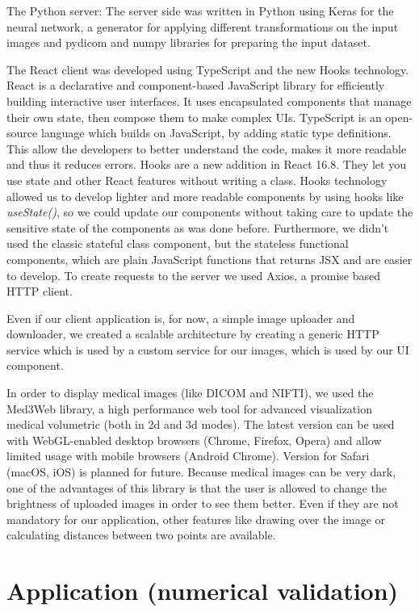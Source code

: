 \documentclass[runningheads,a4paper,11pt]{report}
\begin{document}
The Python server: The server side was written in Python using Keras for the neural network, a generator for applying different transformations on the input images and pydicom and numpy libraries for preparing the input dataset.\par
The React client was developed using TypeScript and the new Hooks technology.
React is a declarative and component-based JavaScript library for efficiently building interactive user interfaces. It uses encapsulated components that manage their own state, then compose them to make complex UIs.\cite{react}
TypeScript is an open-source language which builds on JavaScript, by adding static type definitions. This allow the developers to better understand the code, makes it more readable and thus it reduces errors.
Hooks are a new addition in React 16.8. They let you use state and other React features without writing a class\cite{reactHooks}. Hooks technology allowed us to develop lighter and more readable components by using hooks like \emph{useState()}, so we could update our components without taking care to update the sensitive state of the components as was done before. Furthermore, we didn't used the classic stateful class component, but the stateless functional components, which are plain JavaScript functions that returns JSX and are easier to develop.
To create requests to the server we used Axios, a promise based HTTP client.

Even if our client application is, for now, a simple image uploader and downloader, we created a scalable architecture by creating a generic HTTP service which is used by a custom service for our images, which is used by our UI component.

In order to display medical images (like DICOM and NIFTI), we used the Med3Web library, a high performance web tool for advanced visualization medical volumetric (both in 2d and 3d modes). The latest version can be used with WebGL-enabled desktop browsers (Chrome, Firefox, Opera) and allow limited usage with mobile browsers (Android Chrome). Version for Safari (macOS, iOS) is planned for future.\cite{Med3Web} Because medical images can be very dark, one of the advantages of this library is that the user is allowed to change the brightness of uploaded images in order to see them better. Even if they are not mandatory for our application, other features like drawing over the image or calculating distances between two points are available.


\chapter{Application (numerical validation)}
\label{chapter:application}
\end{document}
